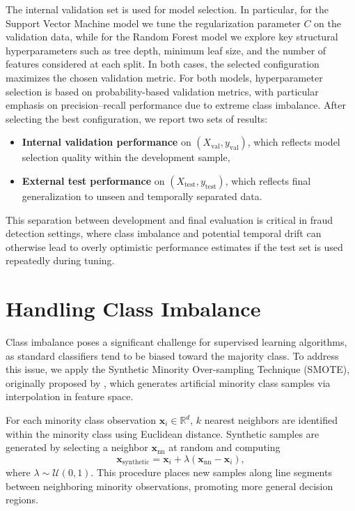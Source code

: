 \documentclass[oneside,12pt,parskip=half,american,numbers=noenddot]{scrreprt}
\begin{document}
The internal validation set is used for model selection. In particular, for the Support Vector Machine model we tune the regularization parameter \(C\) on the validation data, while for the Random Forest model we explore key structural hyperparameters such as tree depth, minimum leaf size, and the number of features considered at each split. In both cases, the selected configuration maximizes the chosen validation metric. For both models, hyperparameter selection is based on probability-based validation metrics, with particular emphasis on precision–recall performance due to extreme class imbalance. After selecting the best configuration, we report two sets of results:
\begin{itemize}
    \item \textbf{Internal validation performance} on \((X_{\text{val}}, y_{\text{val}})\), which reflects model selection quality within the development sample,
    \item \textbf{External test performance} on \((X_{\text{test}}, y_{\text{test}})\), which reflects final generalization to unseen and temporally separated data.
\end{itemize}
This separation between development and final evaluation is critical in fraud detection settings, where class imbalance and potential temporal drift can otherwise lead to overly optimistic performance estimates if the test set is used repeatedly during tuning.
\section{Handling Class Imbalance}
\label{sec:imbalance}

Class imbalance poses a significant challenge for supervised learning algorithms, as standard classifiers tend to be biased toward the majority class. To address this issue, we apply the Synthetic Minority Over-sampling Technique (SMOTE), originally proposed by \textcite{chawla_smote_2002}, which generates artificial minority class samples via interpolation in feature space.

For each minority class observation $\mathbf{x}_i \in \mathbb{R}^d$, $k$ nearest neighbors are identified within the minority class using Euclidean distance. Synthetic samples are generated by selecting a neighbor $\mathbf{x}_{\text{nn}}$ at random and computing
\begin{equation}
\mathbf{x}_{\text{synthetic}} = \mathbf{x}_i + \lambda \left( \mathbf{x}_{\text{nn}} - \mathbf{x}_i \right),
\end{equation}
where $\lambda \sim \mathcal{U}(0,1)$. This procedure places new samples along line segments between neighboring minority observations, promoting more general decision regions.
\end{document}
